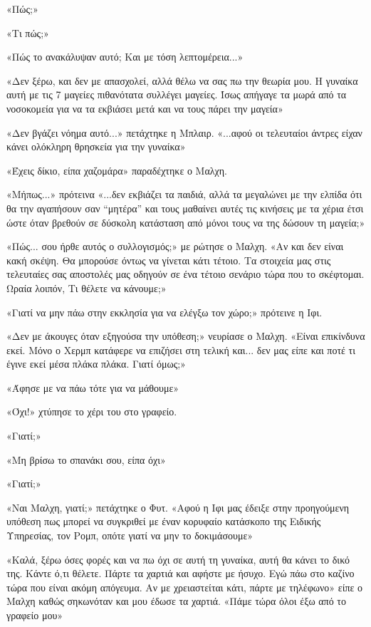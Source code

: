 \documentclass[12pt,twoside, openany]{book}
\begin{document}
«Πώς;»

«Τι πώς;»

«Πώς το ανακάλυψαν αυτό; Και με τόση λεπτομέρεια...»

«Δεν ξέρω, και δεν με απασχολεί, αλλά θέλω να σας πω την θεωρία μου. Η γυναίκα αυτή με τις 7 μαγείες πιθανότατα συλλέγει μαγείες. Ίσως απήγαγε τα μωρά από τα νοσοκομεία για να τα εκβιάσει μετά και να τους πάρει την μαγεία»

«Δεν βγάζει νόημα αυτό...» πετάχτηκε η Μπλαιρ. «...αφού οι τελευταίοι άντρες είχαν κάνει ολόκληρη θρησκεία για την γυναίκα»

«Έχεις δίκιο, είπα χαζομάρα» παραδέχτηκε ο Μαλχη.

«Μήπως...» πρότεινα «...δεν εκβιάζει τα παιδιά, αλλά τα μεγαλώνει με την ελπίδα ότι θα την αγαπήσουν σαν “μητέρα” και τους μαθαίνει αυτές τις κινήσεις με τα χέρια έτσι ώστε όταν βρεθούν σε δύσκολη κατάσταση από μόνοι τους να της δώσουν τη μαγεία;»

«Πώς... σου ήρθε αυτός ο συλλογισμός;» με ρώτησε ο Μαλχη. «Αν και δεν είναι κακή σκέψη. Θα μπορούσε όντως να γίνεται κάτι τέτοιο. Τα στοιχεία μας στις τελευταίες σας αποστολές μας οδηγούν σε ένα τέτοιο σενάριο τώρα που το σκέφτομαι. Ωραία λοιπόν, Τι θέλετε να κάνουμε;»

«Γιατί να μην πάω στην εκκλησία για να ελέγξω τον χώρο;» πρότεινε η Ιφι.

«Δεν με άκουγες όταν εξηγούσα την υπόθεση;» νευρίασε ο Μαλχη. «Είναι επικίνδυνα εκεί. Μόνο ο Χερμπ κατάφερε να επιζήσει στη τελική και... δεν μας είπε και ποτέ τι έγινε εκεί μέσα πλάκα πλάκα. Γιατί όμως;»

«Άφησε με να πάω τότε για να μάθουμε»

«Όχι!» χτύπησε το χέρι του στο γραφείο.

«Γιατί;»

«Μη βρίσω το σπανάκι σου, είπα όχι»

«Γιατί;»

«Ναι Μαλχη, γιατί;» πετάχτηκε ο Φυτ. «Αφού η Ιφι μας έδειξε στην προηγούμενη υπόθεση πως μπορεί να συγκριθεί με έναν κορυφαίο κατάσκοπο της Ειδικής Υπηρεσίας, τον Ρομπ, οπότε γιατί να μην το δοκιμάσουμε»

«Καλά, ξέρω όσες φορές και να πω όχι σε αυτή τη γυναίκα, αυτή θα κάνει το δικό της. Κάντε ό,τι θέλετε. Πάρτε τα χαρτιά και αφήστε με ήσυχο. Εγώ πάω στο καζίνο τώρα που είναι ακόμη απόγευμα. Αν με χρειαστείται κάτι, πάρτε με τηλέφωνο» είπε ο Μαλχη καθώς σηκωνόταν και μου έδωσε τα χαρτιά. «Πάμε τώρα όλοι έξω από το γραφείο μου»
\end{document}
